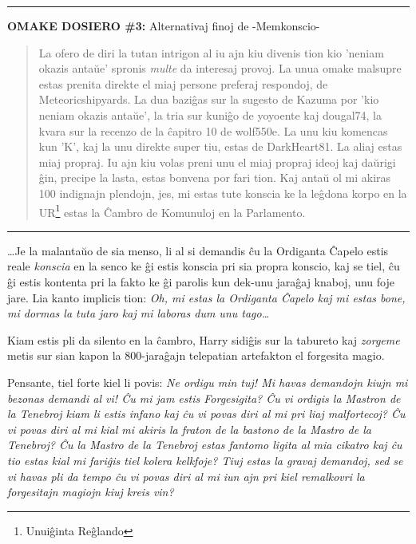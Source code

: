 \begin{center}\rule{3in}{0.4pt}\end{center}

\textbf{OMAKE DOSIERO \#3:} {\hpfont Alternativaj finoj de -Memkonscio-}

\begin{quote}
  La ofero de diri la tutan intrigon al iu ajn kiu divenis tion kio
  'neniam okazis antaŭe' spronis \emph{multe} da interesaj provoj. La
  unua omake malsupre estas prenita direkte el miaj persone preferaj
  respondoj, de Meteoricshipyards. La dua baziĝas sur la sugesto de
  Kazuma por 'kio neniam okazis antaŭe', la tria sur kuniĝo de
  yoyoente kaj dougal74, la kvara sur la recenzo de la ĉapitro 10 de
  wolf550e. La unu kiu komencas kun 'K', kaj la unu direkte super tiu,
  estas de DarkHeart81. La aliaj estas miaj propraj. Iu ajn kiu volas
  preni unu el miaj propraj ideoj kaj daŭrigi ĝin, precipe la lasta,
  estas bonvena por fari tion.  Kaj antaŭ ol mi akiras 100 indignajn
  plendojn, jes, mi estas tute konscia ke la leĝdona korpo en la
  UR\footnote{Unuiĝinta Reĝlando} estas la Ĉambro de Komunuloj en la
  Parlamento.
\end{quote}

\begin{center}\rule{3in}{0.4pt}\end{center}

\ldots Je la malantaŭo de sia menso, li al si demandis ĉu la Ordiganta
Ĉapelo estis reale \emph{konscia} en la senco ke ĝi estis konscia pri
sia propra konscio, kaj se tiel, ĉu ĝi estis kontenta pri la fakto ke
ĝi parolis kun dek-unu jaraĝaj knaboj, unu foje jare. Lia kanto
implicis tion: \emph{Oh, mi estas la Ordiganta Ĉapelo kaj mi estas
  bone, mi dormas la tuta jaro kaj mi laboras dum unu tago\ldots}

Kiam estis pli da silento en la ĉambro, Harry sidiĝis sur la tabureto
kaj \emph{zorgeme} metis sur sian kapon la 800-jaraĝajn telepatian
artefakton el forgesita magio.

Pensante, tiel forte kiel li povis: \emph{Ne ordigu min tuj! Mi havas
  demandojn kiujn mi bezonas demandi al vi! Ĉu mi jam estis
  Forgesigita?  Ĉu vi ordigis la Mastron de la Tenebroj kiam li estis
  infano kaj ĉu vi povas diri al mi pri liaj malfortecoj? Ĉu vi povas
  diri al mi kial mi akiris la fraton de la bastono de la Mastro de la
  Tenebroj?  Ĉu la Mastro de la Tenebroj estas fantomo ligita al mia
  cikatro kaj ĉu tio estas kial mi fariĝis tiel kolera kelkfoje? Tiuj
  estas la gravaj demandoj, sed se vi havas pli da tempo ĉu vi povas
  diri al mi iun ajn pri kiel remalkovri la forgesitajn magiojn kiuj
  kreis vin?}

